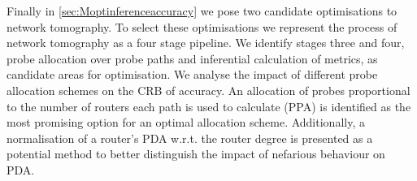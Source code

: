 Finally in \cref{sec:Moptinferenceaccuracy} we pose two candidate optimisations to network tomography. To select these optimisations we represent the process of network tomography as a four stage pipeline. We identify stages three and four, probe allocation over probe paths and inferential calculation of metrics, as candidate areas for optimisation. We analyse the impact of different probe allocation schemes on the CRB of accuracy. An allocation of probes proportional to the number of routers each path is used to calculate (PPA) is identified as the most promising option for an optimal allocation scheme. Additionally, a normalisation of a router's PDA w.r.t. the router degree is presented as a potential method to better distinguish the impact of nefarious behaviour on PDA.\par